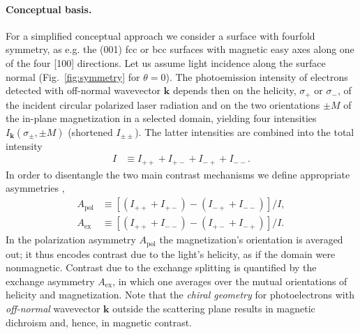 \documentclass[prl,twocolumn,floatfix,superscriptaddress,aps]{revtex4-2}
\renewcommand{\vec}[1]{\boldsymbol{#1}}
\begin{document}
\paragraph{Conceptual basis.} For a simplified conceptual approach we consider a surface with fourfold symmetry, as e.g. the (001) fcc or bcc surfaces with magnetic easy axes along one of the four [100] directions. Let us assume light incidence along the surface normal (Fig.~\ref{fig:symmetry} for $\theta = 0$). The photoemission intensity of electrons detected with off-normal wavevector $\vec{k}$ depends then on the helicity, $\sigma_{+}$ or $\sigma_{-}$, of the incident circular polarized laser radiation and on the two orientations $\pm M$ of the in-plane magnetization in a selected domain, yielding four intensities $I_{\vec{k}}(\sigma_{\pm}, \pm M)$ (shortened $I_{\pm \pm}$). The latter intensities are combined into the total intensity
\begin{align}
    I & \equiv I_{+ +} + I_{+ -} + I_{- +} + I_{- -}. 
\end{align}
In order to disentangle the two main contrast mechanisms we define appropriate asymmetries \cite{henk1998},
\begin{subequations}
\begin{align}
    A_{\mathrm{pol}} & \equiv \left[ \left( I_{+ +} + I_{+ -} \right) - \left( I_{- +} + I_{- -} \right) \right] / I,
    \label{eq:Apol}
    \\
    A_{\mathrm{ex}} & \equiv \left[ \left( I_{+ +} + I_{- -} \right) - \left( I_{+ -} + I_{- +} \right) \right] / I.
    \label{eq:Aex}
\end{align}    
\end{subequations}
In the polarization asymmetry $A_{\mathrm{pol}}$ the magnetization's orientation is averaged out; it thus encodes contrast due to the light's helicity, as if the domain were nonmagnetic. Contrast due to the exchange splitting is quantified by the exchange asymmetry $A_{\mathrm{ex}}$, in which one averages over the mutual orientations of helicity and magnetization. Note that the \emph{chiral geometry} for photoelectrons with \emph{off-normal} wavevector $\vec{k}$ outside the scattering plane results in magnetic dichroism and, hence, in magnetic contrast.
\end{document}
